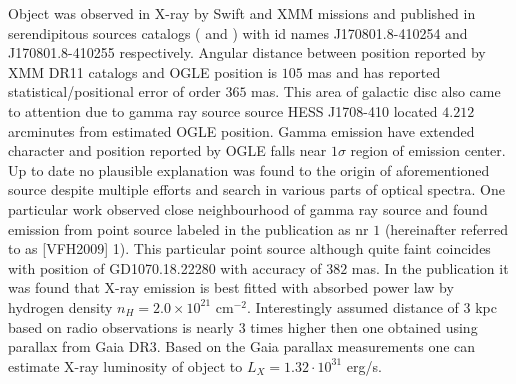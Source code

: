 \documentclass{pracalicmgr}
\begin{document}
Object was observed in X-ray by Swift and XMM missions and published in serendipitous sources catalogs (\citet{evans_2sxps_2020} and \citet{traulsen_xmm-newton_2020}) with id names J170801.8-410254 and J170801.8-410255
respectively. Angular distance between position reported by XMM DR11 catalogs \citep{traulsen_xmm-newton_2020}  and OGLE position is $105$ mas and has reported statistical/positional error of order $365$ mas.
This area of galactic disc also came to attention 
due to gamma ray source source HESS J1708-410 \citep{aharonian_hess_2008} located $4.212$ arcminutes from estimated OGLE position. 
Gamma emission have extended character and position reported by OGLE falls near $1\sigma$ region of emission center.
Up to date no plausible explanation was found to the origin
of aforementioned source despite multiple efforts and search in various parts of optical spectra. One particular work \citep{van_etten_multi-wavelength_2009} observed close neighbourhood of
gamma ray source and found emission from point source labeled in the publication as nr $1$ (hereinafter referred to as [VFH2009] 1).
This particular point source although quite faint coincides with  position of GD1070.18.22280 with accuracy of $382$ mas. 
In the publication it was found that X-ray emission is best fitted with absorbed power law by hydrogen density $n_H=2.0\times 10^{21}$ $\textrm{cm}^{-2}$.
Interestingly assumed distance of $3$ kpc based on radio observations is nearly $3$ times higher then one obtained using parallax from Gaia DR3. %
Based on the Gaia parallax measurements one can estimate X-ray luminosity of object to $L_{X}=1.32\cdot10^{31}$ erg/s.
\end{document}
